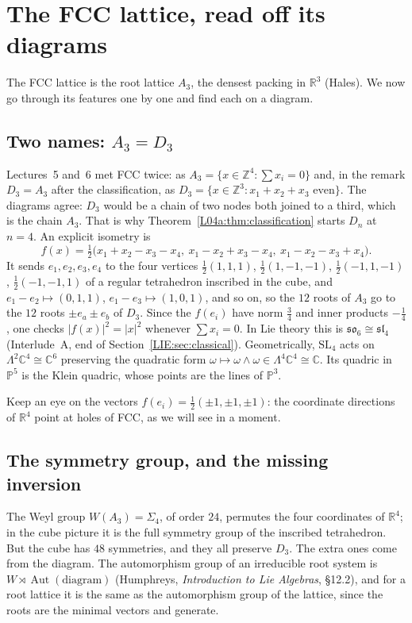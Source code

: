 \documentclass[11pt,openany]{book}
\theoremstyle{plain}
\theoremstyle{definition}
\theoremstyle{remark}
\newcommand{\R}{\mathbb{R}}
\newcommand{\Z}{\mathbb{Z}}
\newcommand{\C}{\mathbb{C}}
\newcommand{\SL}{\mathrm{SL}}
\newcommand{\abs}[1]{\left\lvert #1 \right\rvert}
\begin{document}
\section{The FCC lattice, read off its diagrams}
\label{DYN:sec:fcc}

The FCC lattice is the root lattice $A_3$, the densest packing in $\R^3$ (Hales). We now go through
its features one by one and find each on a diagram.

\subsection*{Two names: $A_3=D_3$}
Lectures~5 and~6 met FCC twice: as $A_3=\{x\in\Z^4:\sum x_i=0\}$ and, in the remark $D_3=A_3$ after the
classification, as $D_3=\{x\in\Z^3:x_1+x_2+x_3\text{ even}\}$.
The diagrams agree: $D_3$ would be a chain of two nodes both joined to a third, which is the chain
$A_3$. That is why Theorem~\ref{L04a:thm:classification} starts $D_n$ at $n=4$. An explicit isometry is
\[
  f(x)=\tfrac12\big(x_1+x_2-x_3-x_4,\ x_1-x_2+x_3-x_4,\ x_1-x_2-x_3+x_4\big).
\]
It sends $e_1,e_2,e_3,e_4$ to the four vertices $\frac12(1,1,1)$, $\frac12(1,-1,-1)$,
$\frac12(-1,1,-1)$, $\frac12(-1,-1,1)$ of a regular tetrahedron inscribed in the cube, and
$e_1-e_2\mapsto(0,1,1)$, $e_1-e_3\mapsto(1,0,1)$, and so on, so the $12$ roots of $A_3$ go to the $12$ roots
$\pm e_a\pm e_b$ of $D_3$. Since the $f(e_i)$ have norm $\frac34$ and inner products $-\frac14$, one checks
$\abs{f(x)}^2=\abs x^2$ whenever $\sum x_i=0$. In Lie theory this is $\mathfrak{so}_6\cong\mathfrak{sl}_4$
(Interlude~A, end of Section~\ref{LIE:sec:classical}). Geometrically, $\SL_4$ acts on
$\Lambda^2\C^4\cong\C^6$ preserving the quadratic form $\omega\mapsto\omega\wedge\omega\in\Lambda^4\C^4\cong\C$.
Its quadric in $\mathbb P^5$ is the Klein quadric, whose points are the lines of $\mathbb P^3$.

Keep an eye on the vectors $f(e_i)=\frac12(\pm1,\pm1,\pm1)$: the coordinate directions of $\R^4$ point
at holes of FCC, as we will see in a moment.

\subsection*{The symmetry group, and the missing inversion}
The Weyl group $W(A_3)=\Sigma_4$, of order $24$, permutes the four coordinates of $\R^4$; in the cube
picture it is the full symmetry group of the inscribed tetrahedron. But the cube has $48$ symmetries,
and they all preserve $D_3$. The extra ones come from the diagram. The automorphism group of an
irreducible root system is $W\rtimes\operatorname{Aut}(\text{diagram})$ (Humphreys, \emph{Introduction
to Lie Algebras}, \S12.2), and for a root lattice it is the same as the automorphism group of the lattice,
since the roots are the minimal vectors and generate.
\end{document}
